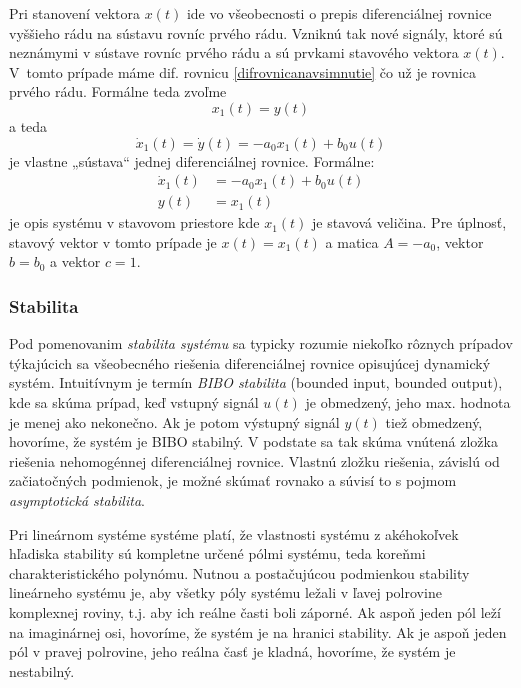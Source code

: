 \documentclass[a4paper, 10pt, ]{article}
\begin{document}
Pri stanovení vektora $x(t)$ ide vo všeobecnosti o prepis diferenciálnej rovnice vyššieho rádu na sústavu rovníc prvého rádu. Vzniknú tak nové signály, ktoré sú neznámymi v sústave rovníc prvého rádu a sú prvkami stavového vektora $x(t)$. V~tomto prípade máme dif. rovnicu \eqref{difrovnicanavsimnutie} čo už je rovnica prvého rádu. Formálne teda zvoľme
\begin{equation}
    x_1(t) = y(t)
\end{equation}
a teda
\begin{equation}
    \dot x_1(t) = \dot y(t) = - a_0 x_1(t) + b_0 u(t)
\end{equation}
je vlastne „sústava“ jednej diferenciálnej rovnice. Formálne:
\begin{subequations}
\begin{align}
    \dot x_1(t) &= - a_0 x_1(t) + b_0 u(t) \\
    y(t) &= x_1(t)
\end{align}
\end{subequations}
je opis systému v stavovom priestore kde $x_1(t)$ je stavová veličina. Pre úplnosť, stavový vektor v tomto prípade je $x(t) = x_1(t)$ a matica $A = -a_0$, vektor $b = b_0$ a vektor $c = 1$.





\subsubsection{Stabilita}

Pod pomenovanim \emph{stabilita systému} sa typicky rozumie niekoľko rôznych prípadov týkajúcich sa všeobecného riešenia diferenciálnej rovnice opisujúcej dynamický systém. Intuitívnym je termín \emph{BIBO stabilita} (bounded input, bounded output), kde sa skúma prípad, keď vstupný signál $u(t)$ je obmedzený, jeho max. hodnota je menej ako nekonečno. Ak je potom výstupný signál $y(t)$ tiež obmedzený, hovoríme, že systém je BIBO stabilný. V podstate sa tak skúma vnútená zložka riešenia nehomogénnej diferenciálnej rovnice. Vlastnú zložku riešenia, závislú od začiatočných podmienok, je možné skúmať rovnako a súvisí to s pojmom \emph{asymptotická stabilita}. 

Pri lineárnom systéme systéme platí, že vlastnosti systému z akéhokoľvek hľadiska stability sú kompletne určené pólmi systému, teda koreňmi charakteristického polynómu. Nutnou a postačujúcou podmienkou stability lineárneho systému je, aby všetky póly systému ležali v ľavej polrovine komplexnej roviny, t.j. aby ich reálne časti boli záporné. Ak aspoň jeden pól leží na imaginárnej osi, hovoríme, že systém je na hranici stability. Ak je aspoň jeden pól v pravej polrovine, jeho reálna časť je kladná, hovoríme, že systém je nestabilný.
\end{document}
